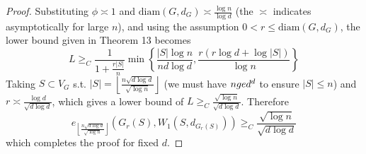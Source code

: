 \documentclass[10pt]{article}
\theoremstyle{definition}
\theoremstyle{definition}
\theoremstyle{definition}
\theoremstyle{definition}
\begin{document}
\begin{proof}
Substituting $\phi\asymp 1$ and $\textrm{diam}(G,d_G)\asymp\frac{\log n}{\log d}$ (the $\asymp$ indicates asymptotically for large $n$), and using the assumption $0<r\le\textrm{diam}(G,d_G)$, the lower bound given in Theorem 13 becomes
$$L\ge_C\frac{1}{1+\frac{r|S|}{n}}\min\left\{\frac{|S|\log n}{nd\log d},\frac{r(r\log d+\log|S|)}{\log n}\right\}$$
Taking $S\subset V_G$ s.t. $|S|=\left\lfloor\frac{n\sqrt{d\log d}}{\sqrt{\log n}}\right\rfloor$ (we must have $n\\ge d^d$ to ensure $|S|\le n$) and $r\asymp\frac{\log d}{\sqrt{d\log d}}$, which gives a lower bound of $L\ge_C\frac{\sqrt{\log n}}{\sqrt{d\log d}}$. Therefore
$$e_{\left\lfloor\frac{n\sqrt{d\log d}}{\sqrt{\log n}}\right\rfloor}(G_r(S),W_1(S,d_{G_r(S)}))\ge_C\frac{\sqrt{\log n}}{\sqrt{d\log d}}$$
which completes the proof for fixed $d$.
\end{proof}
\end{document}

